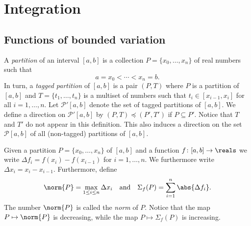 \documentclass[article, a4paper, 11pt, oneside]{memoir}
\numberwithin{equation}{chapter}
\newcommand{\calP}{\mathcal{P}}
\newcommand{\calR}{\mathcal{R}}
\begin{document}
\chapter{Integration}

\section{Functions of bounded variation}

\newcommand{\boundedvar}[1]{\mathit{BV}[#1]}
\newcommand{\integrable}[2][]{\calR_{#1}[#2]}

A \emph{partition} of an interval $[a,b]$ is a collection $P = \{x_0, \ldots, x_n \}$ of real numbers such that
%
\begin{equation*}
    a = x_0 < \cdots < x_n = b.
\end{equation*}
%
In turn, a \emph{tagged partition} of $[a,b]$ is a pair $(P,T)$ where $P$ is a partition of $[a,b]$ and $T = \{t_1, \ldots, t_n\}$ is a multiset of numbers such that $t_i \in [x_{i-1}, x_i]$ for all $i = 1, \ldots, n$. Let $\calP'[a,b]$ denote the set of tagged partitions of $[a,b]$. We define a direction on $\calP'[a,b]$ by $(P,T) \preceq (P',T')$ if $P \subseteq P'$. Notice that $T$ and $T'$ do not appear in this definition. This also induces a direction on the set $\calP[a,b]$ of all (non-tagged) partitions of $[a,b]$.

Given a partition $P = \{x_0, \ldots, x_n \}$ of $[a,b]$ and a function $f \colon [a,b] \to \reals$ we write $\Delta f_i = f(x_i) - f(x_{i-1})$ for $i = 1, \ldots, n$. We furthermore write $\Delta x_i = x_i - x_{i-1}$. Furthermore, define
%
\begin{equation*}
    \norm{P}
        = \max_{1 \leq i \leq n} \Delta x_i
    \quad \text{and} \quad
    \Sigma_f(P)
        = \sum_{i=1}^n \abs{\Delta f_i}.
\end{equation*}
%
The number $\norm{P}$ is called the \emph{norm} of $P$. Notice that the map $P \mapsto \norm{P}$ is decreasing, while the map $P \mapsto \Sigma_f(P)$ is increasing.
\end{document}
